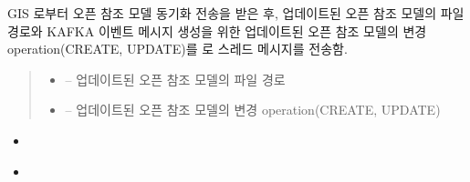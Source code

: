 \documentclass[a4paper,10pt,english]{sphinxmanual}
\begin{document}
\begin{fulllineitems}
\begin{fulllineitems}
\label{\detokenize{_RMSync:RMSync._dmUpdateReferenceModel}}
\pysigstartsignatures
{}
\pysigstopsignatures
\sphinxAtStartPar
GIS 로부터 오픈 참조 모델 동기화 전송을 받은 후, 업데이트된 오픈 참조 모델의 파일 경로와
KAFKA 이벤트 메시지 생성을 위한 업데이트된 오픈 참조 모델의 변경 operation(CREATE, UPDATE)를
{\hyperref[\detokenize{_DHDaemon:dhdaemon}]{}} 로  스레드 메시지를 전송함.
\begin{quote}\begin{description}
\begin{itemize}
\item {} 
\sphinxAtStartPar
{} – 업데이트된 오픈 참조 모델의 파일 경로

\item {} 
\sphinxAtStartPar
{} – 업데이트된 오픈 참조 모델의 변경 operation(CREATE, UPDATE)

\end{itemize}

\end{description}\end{quote}


\nopagebreak

\begin{itemize}
\item {} 
\sphinxAtStartPar
{\hyperref[\detokenize{_DHDaemon:DHDaemon._rmSyncListener}]{}}

\item {} 
\sphinxAtStartPar
{\hyperref[\detokenize{_RMSync:RMSync.Subscribe}]{}}

\end{itemize}



\end{fulllineitems}



\end{fulllineitems}
\end{document}
